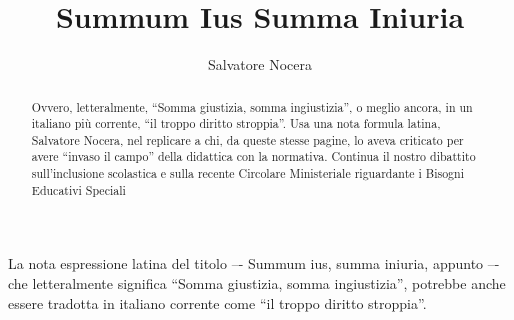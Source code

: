 \author{Salvatore Nocera}
\title{Summum Ius Summa Iniuria}
\label{cha:nocera130613}
\begin{abstract}
Ovvero, letteralmente, “Somma giustizia, somma ingiustizia”, o meglio ancora, in un italiano più corrente, “il troppo diritto stroppia”. Usa una nota formula latina, Salvatore Nocera, nel replicare a chi, da queste stesse pagine, lo aveva criticato per avere “invaso il campo” della didattica con la normativa. Continua il nostro dibattito sull'inclusione scolastica e sulla recente Circolare Ministeriale riguardante i Bisogni Educativi Speciali
\end{abstract}
\maketitle
{}
La nota espressione latina del titolo –- Summum ius, summa iniuria, appunto –- che letteralmente significa “Somma giustizia, somma ingiustizia”, potrebbe anche essere tradotta in italiano corrente come “il troppo diritto stroppia”.


